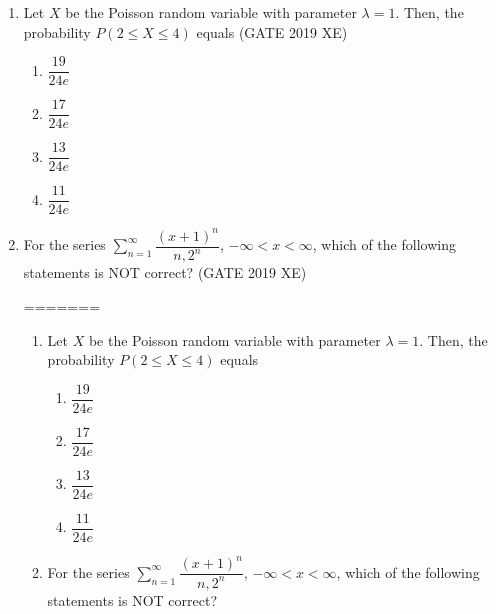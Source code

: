 \documentclass[journal,12pt,onecolumn]{IEEEtran}
\begin{document}
\begin{enumerate}
\item Let $X$ be the Poisson random variable with parameter $\lambda=1$. Then, the probability $P(2 \le X \le 4)$ equals
\hfill{(GATE 2019 XE)} \\
\begin{multicols}{2}
\begin{enumerate}
\item $\dfrac{19}{24e}$
\item $\dfrac{17}{24e}$
\item $\dfrac{13}{24e}$
\item $\dfrac{11}{24e}$
\end{enumerate}
\end{multicols}

\item For the series $\sum_{n=1}^{\infty}\dfrac{(x+1)^n}{n,2^n}$, $-\infty<x<\infty$, which of the following statements is NOT correct?
\hfill{(GATE 2019 XE)} \\
\begin{multicols}{2}
\begin{enumerate}
=======
\vspace{1cm}

\begin{enumerate}[label=\arabic*)]
\item Let $X$ be the Poisson random variable with parameter $\lambda=1$. Then, the probability $P(2 \le X \le 4)$ equals
\hfill{} \\

\vspace{0.2cm}
\begin{enumerate}[label=\alph*)]
\item $\dfrac{19}{24e}$
\vspace{0.1cm}
\item $\dfrac{17}{24e}$
\vspace{0.1cm}
\item $\dfrac{13}{24e}$
\vspace{0.1cm}
\item $\dfrac{11}{24e}$
\end{enumerate}

\vspace{0.5cm}

\item For the series $\sum_{n=1}^{\infty}\dfrac{(x+1)^n}{n,2^n}$, $-\infty<x<\infty$, which of the following statements is NOT correct?
\vspace{0.1cm}
\hfill{} \\


\end{enumerate}
\end{enumerate}
\end{multicols}
\end{enumerate}
\end{document}
